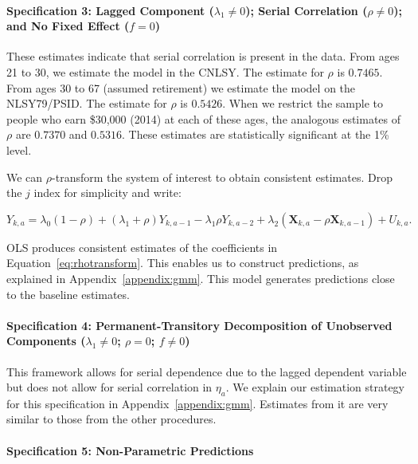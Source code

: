 \paragraph{Specification 3: Lagged Component ($\lambda_{1} \neq 0$); Serial Correlation ($\rho \neq 0$); and No Fixed Effect ($f = 0$)} \label{section:laggedserial}

These estimates indicate that serial correlation is present in the data. From ages 21 to 30, we estimate the model in the CNLSY. The estimate for $\rho$ is $0.7465$. From ages 30 to 67 (assumed retirement) we estimate the model on the NLSY79/PSID. The estimate for $\rho$ is $0.5426$. When we restrict the sample to people who earn \$30,000 (2014) at each of these ages, the analogous estimates of $\rho$ are $0.7370$ and $0.5316$. These estimates are statistically significant at the 1\% level.

We can $\rho$-transform the system of interest to obtain consistent estimates. Drop the $j$ index for simplicity and write:

\begin{equation}
Y_{k,a} = \lambda_{0} \left( 1 - \rho \right) + \left( \lambda_{1} + \rho \right) Y_{k,a-1} - \lambda_{1} \rho Y_{k,a-2} + \lambda_{2} \left( \bm{X}_{k,a} - \rho \bm{X}_{k,a-1}  \right) + U_{k,a}. \label{eq:rhotransform}
\end{equation}

OLS produces consistent estimates of the coefficients in Equation~\eqref{eq:rhotransform}. This enables us to construct predictions, as explained in Appendix~\ref{appendix:gmm}. This model generates predictions close to the baseline estimates.

\paragraph{Specification 4: Permanent-Transitory Decomposition of Unobserved Components ($\lambda_{1} \neq 0$; $\rho = 0$; $f \neq 0$)} \label{app:permtrans}

This framework allows for serial dependence due to the lagged dependent variable but does not allow for serial correlation in $\eta_{a}$. We explain our estimation strategy for this specification in Appendix~\ref{appendix:gmm}. Estimates from it are very similar to those from the other procedures.

\paragraph{Specification 5: Non-Parametric Predictions}

